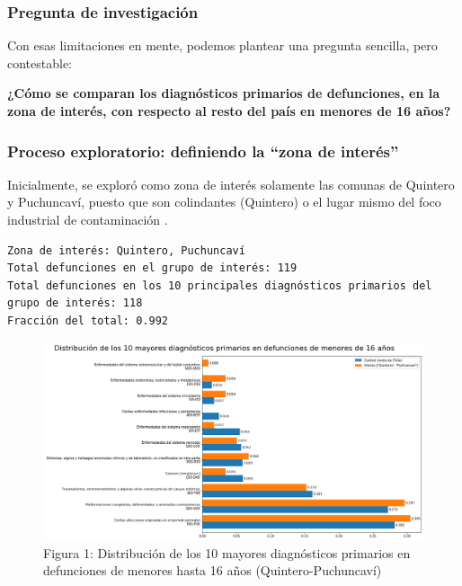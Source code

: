 \documentclass[]{article}
\begin{document}
\hypertarget{pregunta-de-investigaciuxf3n}{%
\subsubsection{Pregunta de
investigación}\label{pregunta-de-investigaciuxf3n}}

Con esas limitaciones en mente, podemos plantear una pregunta sencilla,
pero contestable:

\textbf{¿Cómo se comparan los diagnósticos primarios de defunciones, en
la zona de interés, con respecto al resto del país en menores de 16
años?}

\hypertarget{proceso-exploratorio-definiendo-la-zona-de-interuxe9s}{%
\subsubsection{Proceso exploratorio: definiendo la ``zona de
interés''}\label{proceso-exploratorio-definiendo-la-zona-de-interuxe9s}}

Inicialmente, se exploró como zona de interés solamente las comunas de
Quintero y Puchuncaví, puesto que son colindantes (Quintero) o el lugar mismo del
foco industrial de contaminación .

\begin{verbatim}
Zona de interés: Quintero, Puchuncaví
Total defunciones en el grupo de interés: 119
Total defunciones en los 10 principales diagnósticos primarios del grupo de interés: 118
Fracción del total: 0.992
\end{verbatim}

\begin{figure}
\centering
\includegraphics{assets/10-diagnosticos-(Quintero-Puchuncavi).png}
\caption{Figura 1: Distribución de los 10 mayores diagnósticos primarios en defunciones de menores hasta 16 años (Quintero-Puchuncaví)}
\end{figure}
\end{document}
